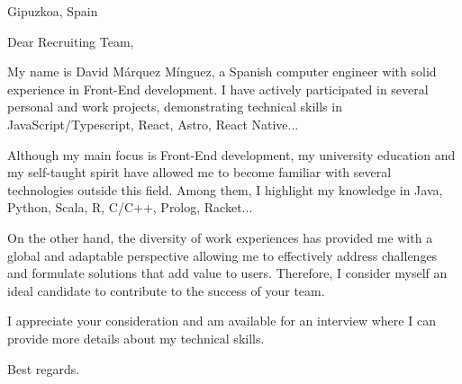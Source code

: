 \documentclass[letterpaper,11pt]{letter}
\begin{document}
\begin{letter}{Gipuzkoa, Spain}
\address{C/Zarautz 84, 20018 San Sebastián}

\opening{Dear Recruiting Team,}

My name is David Márquez Mínguez, a Spanish computer engineer with solid experience in Front-End development. I have actively participated in several personal and 
work projects, demonstrating technical skills in JavaScript/Typescript, React, Astro, React Native...

Although my main focus is Front-End development, my university education and my self-taught spirit have allowed me to become familiar with several technologies 
outside this field. Among them, I highlight my knowledge in Java, Python, Scala, R, C/C++, Prolog, Racket...

On the other hand, the diversity of work experiences has provided me with a global and adaptable perspective allowing me to effectively address challenges and
formulate solutions that add value to users. Therefore, I consider myself an ideal candidate to contribute to the success of your team.

I appreciate your consideration and am available for an interview where I can provide more details about my technical skills.

\signature{\vspace{-35pt}David Márquez Mínguez}
\closing{Best regards.}




\end{letter}
\end{document}
